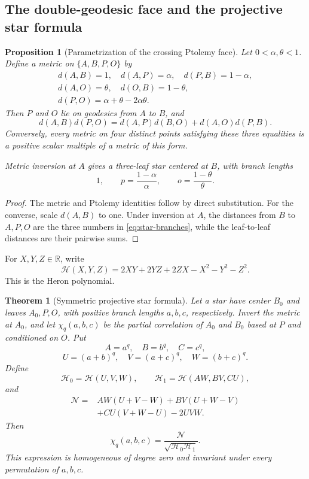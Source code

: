 \documentclass[11pt]{amsart}
\newtheorem{theorem}{Theorem}[section]
\newtheorem{proposition}[proposition]{Proposition}
\theoremstyle{definition}
\theoremstyle{remark}
\newcommand{\R}{\mathbb R}
\newcommand{\Her}{\mathcal H}
\begin{document}
\subsection{The double-geodesic face and the projective star formula}

\begin{proposition}[Parametrization of the crossing Ptolemy face]\label{prop:mismatch}
Let \(0<\alpha,\theta<1\). Define a metric on \(\{A,B,P,O\}\) by
\[
 \begin{gathered}
 d(A,B)=1,
 \quad d(A,P)=\alpha,
 \quad d(P,B)=1-\alpha,\\
 d(A,O)=\theta,
 \quad d(O,B)=1-\theta,\\
 d(P,O)=\alpha+\theta-2\alpha\theta.
 \end{gathered}
\]
Then \(P\) and \(O\) lie on geodesics from \(A\) to \(B\), and
\[
 d(A,B)d(P,O)
 =d(A,P)d(B,O)+d(A,O)d(P,B).
\]
Conversely, every metric on four distinct points satisfying these three
equalities is a positive scalar multiple of a metric of this form.

Metric inversion at \(A\) gives a three-leaf star centered at \(B\), with branch lengths
\begin{equation}\label{eq:star-branches}
 1,
 \qquad
 p=\frac{1-\alpha}{\alpha},
 \qquad
 o=\frac{1-\theta}{\theta}.
\end{equation}
\end{proposition}

\begin{proof}
The metric and Ptolemy identities follow by direct substitution. For the converse, scale \(d(A,B)\) to one. Under inversion at \(A\), the distances from \(B\) to \(A,P,O\) are the three numbers in \eqref{eq:star-branches}, while the leaf-to-leaf distances are their pairwise sums.
\end{proof}

For $X,Y,Z\in\R$, write
\begin{equation}\label{eq:heron-polynomial}
 \Her(X,Y,Z)=2XY+2YZ+2ZX-X^2-Y^2-Z^2.
\end{equation}
This is the Heron polynomial.

\begin{theorem}[Symmetric projective star formula]\label{thm:star-formula}
Let a star have center $B_0$ and leaves $A_0,P,O$, with positive
branch lengths $a,b,c$, respectively. Invert the metric at $A_0$, and
let $\chi_q(a,b,c)$ be the partial correlation of $A_0$ and $B_0$ based
at $P$ and conditioned on $O$. Put
\[
 A=a^q,
 \quad B=b^q,
 \quad C=c^q,
\]
\[
 U=(a+b)^q,
 \quad V=(a+c)^q,
 \quad W=(b+c)^q.
\]
Define
\[
 \mathcal H_0=\Her(U,V,W),
 \qquad
 \mathcal H_1=\Her(AW,BV,CU),
\]
and
\begin{align*}
 \mathcal N={}&AW(U+V-W)+BV(U+W-V)\\
 &+CU(V+W-U)-2UVW.
\end{align*}
Then
\begin{equation}\label{eq:star-correlation}
 \chi_q(a,b,c)
 =\frac{\mathcal N}{\sqrt{\mathcal H_0\mathcal H_1}}.
\end{equation}
This expression is homogeneous of degree zero and invariant under every permutation of \(a,b,c\).
\end{theorem}
\end{document}
